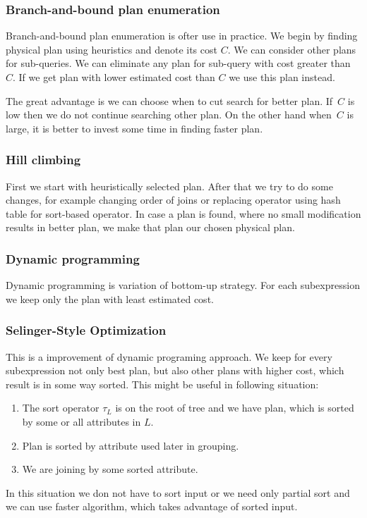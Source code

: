 \subsubsection{Branch-and-bound plan enumeration}
Branch-and-bound plan enumeration is ofter use in practice. We begin by finding physical plan using heuristics and denote its cost $C$. We can consider other plans for sub-queries. We can eliminate any plan for sub-query with cost greater than~$C$. If we get plan with lower estimated cost than $C$ we use this plan instead.

The great advantage is we can choose when to cut search for better plan. If~$C$ is low then we do not continue searching other plan. On the other hand when~$C$ is large, it is better to invest some time in finding faster plan.
\subsubsection{Hill climbing}

First we start with heuristically selected plan. After that we try to do some changes, for example changing order of joins or replacing operator using hash table for sort-based operator. In case a plan is found, where no small modification results in better plan, we make that plan our chosen physical plan.

\subsubsection{Dynamic programming}
Dynamic programming is variation of bottom-up strategy. For each subexpression we keep only the plan with least estimated cost.

\subsubsection{Selinger-Style Optimization}
This is a improvement of dynamic programing approach. We keep for every subexpression not only best plan, but also other plans with higher cost, which result is in some way sorted. This might be useful in following situation:
\begin{enumerate}
\item The sort operator $\tau_L$ is on the root of tree and we have plan, which is sorted by some or all attributes in $L$.
\item Plan is sorted by attribute used later in grouping.
\item We are joining by some sorted attribute.
\end{enumerate}
In this situation we don not have to sort input or we need only partial sort and we can use faster algorithm, which takes advantage of sorted input.


